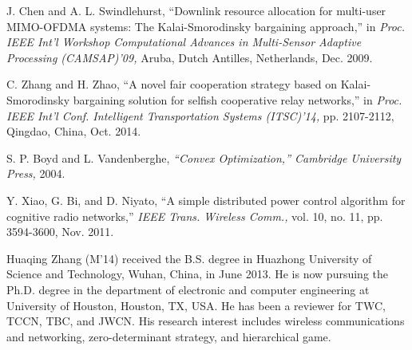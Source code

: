 \documentclass[twocolumn,10pt]{IEEEtran}
\begin{document}
\begin{thebibliography}{1}
J. Chen and A. L. Swindlehurst, ``Downlink resource allocation for multi-user MIMO-OFDMA systems: The Kalai-Smorodinsky bargaining approach,'' in {\em \it Proc. IEEE Int'l Workshop Computational Advances in Multi-Sensor Adaptive Processing (CAMSAP)'09,} Aruba, Dutch Antilles, Netherlands, Dec. 2009.

C. Zhang and H. Zhao, ``A novel fair cooperation strategy based on Kalai-Smorodinsky bargaining solution for selfish cooperative relay networks,'' in {\em \it Proc. IEEE Int'l Conf. Intelligent Transportation Systems (ITSC)'14,} pp. 2107-2112, Qingdao, China, Oct. 2014.

S. P. Boyd and L. Vandenberghe, {\em ``Convex Optimization,''  Cambridge
University Press,} 2004.

Y. Xiao, G. Bi, and D. Niyato, ``A simple distributed power control algorithm for cognitive radio networks,'' {\em \it IEEE Trans. Wireless Comm.,} vol. 10, no. 11, pp. 3594-3600, Nov. 2011.



\end{thebibliography}


\begin{IEEEbiography}{Huaqing Zhang} (M'14) received the B.S. degree in Huazhong University of Science and Technology, Wuhan, China, in June 2013. He is now pursuing the Ph.D. degree in the department of electronic and computer engineering at University of Houston, Houston, TX, USA. He has been a reviewer for TWC, TCCN, TBC, and JWCN. His research interest includes wireless communications and networking, zero-determinant strategy, and hierarchical game.
\end{IEEEbiography}
\end{document}
